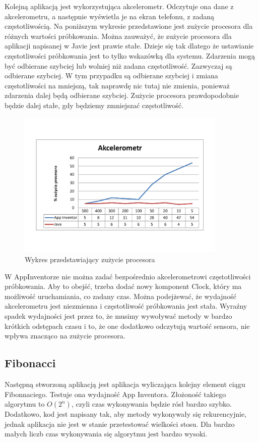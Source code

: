 Kolejną aplikacją jest wykorzystująca akcelerometr. Odczytuje ona dane z akcelerometru, a następnie wyświetla je na ekran telefonu, z zadaną częstotliwością. Na poniższym wykresie przedstawione jest zużycie procesora dla różnych wartości próbkowania. Można zauważyć, że zużycie procesora dla aplikacji napisanej w Javie jest prawie stałe. Dzieje się tak dlatego że ustawianie częstotliwości próbkowania jest to tylko wskazówką dla systemu. Zdarzenia mogą być odbierane szybciej lub wolniej niż zadana częstotliwość. Zazwyczaj są odbierane szybciej. W tym przypadku są odbierane szybciej i zmiana częstotliwości na mniejszą, tak naprawdę nic tutaj nie zmienia, ponieważ zdarzenia dalej będą odbierane szybciej. Zużycie procesora prawdopodobnie będzie dalej stałe, gdy będziemy zmniejszać częstotliwość.\cite{doc:android}

\begin{figure}[H]
\centering\includegraphics[width=10cm]{figures/apps/accelerometerChart}
\caption{Wykres przedstawiający zużycie procesora}
\end{figure}

W AppInventorze nie można zadać bezpośrednio akcelerometrowi częstotliwości próbkowania. Aby to obejść, trzeba dodać nowy komponent Clock, który ma możliwość uruchamiania, co zadany czas. Można podejżewać, że wydajność akcelerometru jest niezmienna i częstotliwość próbkowania jest stała. Wyraźny spadek wydajności jest przez to, że musimy wywoływać metody w bardzo krótkich odstępach czasu i to, że one dodatkowo odczytują wartość sensora, nie wpływa znacząco na zużycie procesora.


\subsection{Fibonacci}

Następną stworzoną aplikacją jest aplikacja wyliczająca kolejny element ciągu Fibonnaciego. Testuje ona wydajność App Inventora. Złożoność takiego algorytmu to $O(2^n)$, czyli czas wykonywania będzie rósł bardzo szybko. Dodatkowo, kod jest napisany tak, aby metody wykonywały się rekurencyjnie, jednak aplikacja nie jest w stanie przetestować wielkości stosu. Dla bardzo małych liczb czas wykonywania się algorytmu jest bardzo wysoki.

